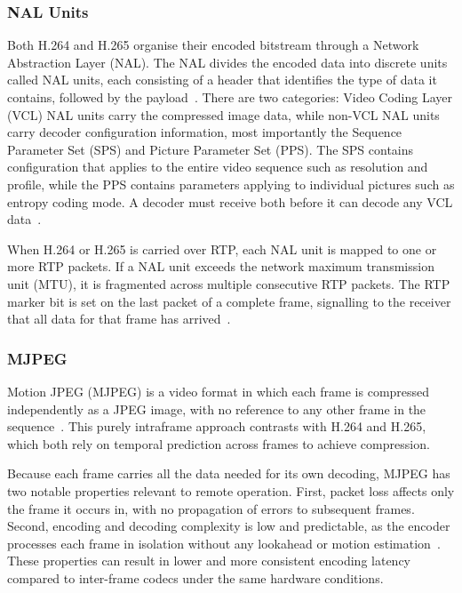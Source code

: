 \subsubsection{NAL Units}\label{subsubsec:nal}
 
Both H.264 and H.265 organise their encoded bitstream through a Network Abstraction Layer (NAL). The NAL divides the encoded data into discrete units called NAL units, each consisting of a header that identifies the type of data it contains, followed by the payload~\cite{wiegand2003}. There are two categories: Video Coding Layer (VCL) NAL units carry the compressed image data, while non-VCL NAL units carry decoder configuration information, most importantly the Sequence Parameter Set (SPS) and Picture Parameter Set (PPS). The SPS contains configuration that applies to the entire video sequence such as resolution and profile, while the PPS contains parameters applying to individual pictures such as entropy coding mode. A decoder must receive both before it can decode any VCL data~\cite{vocal_nal}.
 
When H.264 or H.265 is carried over RTP, each NAL unit is mapped to one or more RTP packets. If a NAL unit exceeds the network maximum transmission unit (MTU), it is fragmented across multiple consecutive RTP packets. The RTP marker bit is set on the last packet of a complete frame, signalling to the receiver that all data for that frame has arrived~\cite{rfc6184}.

\subsubsection{MJPEG}\label{subsubsec:mjpeg}
Motion JPEG (MJPEG) is a video format in which each frame is compressed independently as a JPEG image, with no reference to any other frame in the sequence~\cite{wikipedia_mjpeg}. This purely intraframe approach contrasts with H.264 and H.265, which both rely on temporal prediction across frames to achieve compression.
 
Because each frame carries all the data needed for its own decoding, MJPEG has two notable properties relevant to remote operation. First, packet loss affects only the frame it occurs in, with no propagation of errors to subsequent frames. Second, encoding and decoding complexity is low and predictable, as the encoder processes each frame in isolation without any lookahead or motion estimation~\cite{econ2024}. These properties can result in lower and more consistent encoding latency compared to inter-frame codecs under the same hardware conditions.
 
